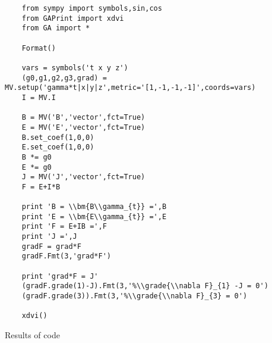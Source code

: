 \documentclass[10pt]{article}
\newcommand{\grade}[1]{\left < {#1} \right >}
\begin{document}
\begin{lstlisting}
    from sympy import symbols,sin,cos
    from GAPrint import xdvi
    from GA import *

    Format()

    vars = symbols('t x y z')
    (g0,g1,g2,g3,grad) = MV.setup('gamma*t|x|y|z',metric='[1,-1,-1,-1]',coords=vars)
    I = MV.I

    B = MV('B','vector',fct=True)
    E = MV('E','vector',fct=True)
    B.set_coef(1,0,0)
    E.set_coef(1,0,0)
    B *= g0
    E *= g0
    J = MV('J','vector',fct=True)
    F = E+I*B

    print 'B = \\bm{B\\gamma_{t}} =',B
    print 'E = \\bm{E\\gamma_{t}} =',E
    print 'F = E+IB =',F
    print 'J =',J
    gradF = grad*F
    gradF.Fmt(3,'grad*F')

    print 'grad*F = J'
    (gradF.grade(1)-J).Fmt(3,'%\\grade{\\nabla F}_{1} -J = 0')
    (gradF.grade(3)).Fmt(3,'%\\grade{\\nabla F}_{3} = 0')

    xdvi()
\end{lstlisting}
Results of code
\end{document}
